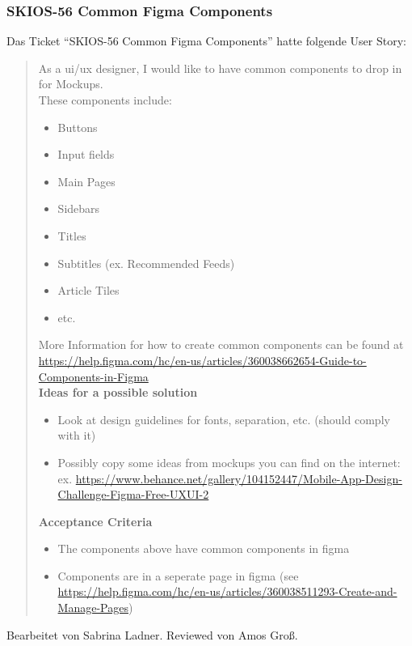 \subsubsection{SKIOS-56 Common Figma Components}
Das Ticket \enquote{SKIOS-56 Common Figma Components} hatte folgende User Story:
\begin{quotation}
    As a ui/ux designer, I would like to have common components to drop in for Mockups. \\
    These components include:
    \begin{itemize}
        \item Buttons
        \item Input fields
        \item Main Pages
        \item Sidebars
        \item Titles
        \item Subtitles (ex. Recommended Feeds)
        \item Article Tiles
        \item etc.
    \end{itemize}
    More Information for how to create common components can be found at\\
    \url{https://help.figma.com/hc/en-us/articles/360038662654-Guide-to-Components-in-Figma}\\
    \textbf{Ideas for a possible solution}
    \begin{itemize}
        \item Look at design guidelines for fonts, separation, etc. (should comply with it)
        \item Possibly copy some ideas from mockups you can find on the internet: ex.
        \url{https://www.behance.net/gallery/104152447/Mobile-App-Design-Challenge-Figma-Free-UXUI-2} \\
    \end{itemize}
    \textbf{Acceptance Criteria}
    \begin{itemize}
        \item The components above have common components in figma
        \item Components are in a seperate page in figma
        (see \url{https://help.figma.com/hc/en-us/articles/360038511293-Create-and-Manage-Pages}) \\
    \end{itemize}
\end{quotation}
Bearbeitet von Sabrina Ladner.
Reviewed von Amos Groß.

